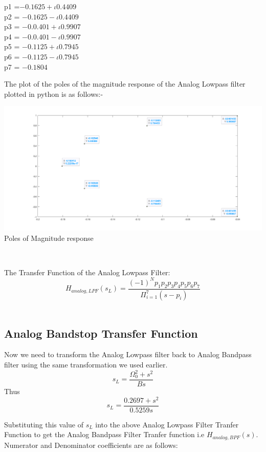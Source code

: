 \documentclass{article}
\begin{document}
\begin{center}
p1 =$ -0.1625 + \iota 0.4409$\\
p2 = $-0.1625 - \iota 0.4409$\\
p3 = $-0.0.401 + \iota 0.9907$\\
p4 = $-0.0.401 - \iota 0.9907$\\
p5 = $-0.1125 + \iota 0.7945$ \\
p6 = $-0.1125 - \iota 0.7945$ \\
p7 = $-0.1804$\\

\end{center}
The plot of the poles of the magnitude response of the Analog Lowpass filter plotted in python is as follows:-

\newpage
\begin{center}
     \includegraphics[scale = 0.25]{poles.png}\\
    \caption{Poles of Magnitude response}\\
\end{center}
   
The Transfer Function of the Analog Lowpass Filter:\\

\[H_{analog,LPF}(s_{L}) = \frac{(-1)^{N}p_{1}p_{2}p_{3}p_{4}p_{5}p_{6}p_{7}}{\Pi_{i=1}^{7} (s-p_{i})} \]\\

 \subsection{Analog Bandstop Transfer Function}

Now we need to transform the Analog Lowpass filter back to Analog Bandpass filter using the same transformation we used earlier.
\[s_{L} = \frac{\Omega_{0}^2 + s^2}{Bs}\]
Thus
\[s_{L} = \frac{0.2697 + s^2}{0.5259s}\]

Substituting this value of $s_{L}$ into the above Analog Lowpass Filter Tranfer Function to get the Analog Bandpass Filter Tranfer function i.e \textbf{$H_{analog,BPF}(s)$}. Numerator and Denominator coefficients are as follows:
\end{document}
